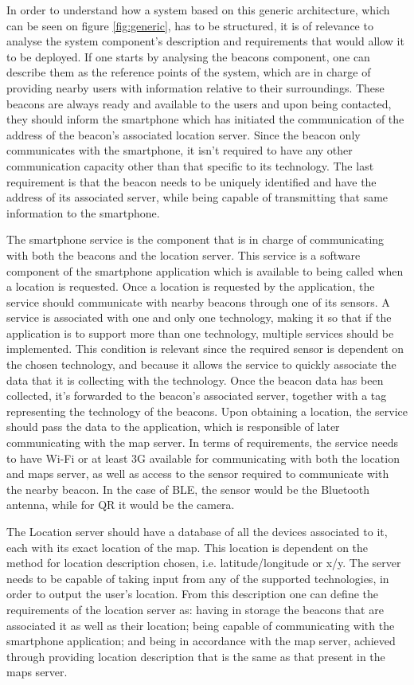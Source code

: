 \documentclass[a4paper]{IEEEtran}
\begin{document}
 
In order to understand how a system based on this generic architecture, which can be seen on figure \ref{fig:generic}, has to be structured, it is of relevance to analyse the system component's description and requirements that would allow it to be deployed. If one starts by analysing the beacons component, one can describe them as the reference points of the system, which are in charge of providing nearby users with information relative to their surroundings. These beacons are always ready and available to the users and upon being contacted, they should inform the smartphone which has initiated the communication of the address of the beacon's associated location server. Since the beacon only communicates with the smartphone, it isn't required to have any other communication capacity other than that specific to its technology. The last requirement is that the beacon needs to be uniquely identified and have the address of its associated server, while being capable of transmitting that same information to the smartphone. 
 
 
The smartphone service is the component that is in charge of communicating with both the beacons and the location server. This service is a software component of the smartphone application which is available to being called when a location is requested. Once a location is requested by the application, the service should communicate with nearby beacons through one of its sensors. A service is associated with one and only one technology, making it so that if the application is to support more than one technology, multiple services should be implemented. This condition is relevant since the required sensor is dependent on the chosen technology, and because it allows the service to quickly associate the data that it is collecting with the technology. Once the beacon data has been collected, it's forwarded to the beacon's associated server, together with a tag representing the technology of the beacons. Upon obtaining a location, the service should pass the data to the application, which is responsible of later communicating with the map server. In terms of requirements, the service needs to have Wi-Fi or at least 3G available for communicating with both the location and maps server, as well as access to the sensor required to communicate with the nearby beacon. In the case of BLE, the sensor would be the Bluetooth antenna, while for QR it would be the camera. 
 
 
The Location server should have a database of all the devices associated to it, each with its exact location of the map. This location is dependent on the method for location description chosen, i.e. latitude/longitude or x/y. The server needs to be capable of taking input from any of the supported technologies, in order to output the user's location. From this description one can define the requirements of the location server as: having in storage the beacons that are associated it as well as their location; being capable of communicating with the smartphone application; and being in accordance with the map server, achieved through providing location description that is the same as that present in the maps server. 
 
\end{document}
